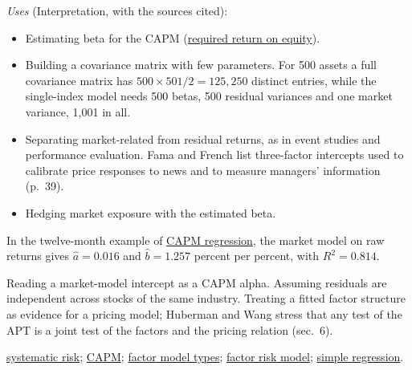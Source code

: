 \begin{qfmodel}
 \emph{Uses} (Interpretation, with the sources cited):
\begin{itemize}
\item Estimating beta for the CAPM (\hyperref[meth:required-return-on-equity]{required return on equity}).
\item Building a covariance matrix with few parameters. For 500 assets a full covariance matrix has $500\times501/2=125{,}250$ distinct entries, while the single-index model needs 500 betas, 500 residual variances and one market variance, 1{,}001 in all.
\item Separating market-related from residual returns, as in event studies and performance evaluation. Fama and French list three-factor intercepts used to calibrate price responses to news and to measure managers' information (p.~39).
\item Hedging market exposure with the estimated beta.
\end{itemize}
In the twelve-month example of \hyperref[meth:capm-regression]{CAPM regression}, the market model on raw returns gives $\hat a=0.016$ and $\hat b=1.257$ percent per percent, with $R^2=0.814$.

 Reading a market-model intercept as a CAPM alpha. Assuming residuals are independent across stocks of the same industry. Treating a fitted factor structure as evidence for a pricing model; Huberman and Wang stress that any test of the APT is a joint test of the factors and the pricing relation (sec.~6).

 \hyperref[mech:systematic-risk-pricing]{systematic risk}; \hyperref[mod:capm-sml]{CAPM}; \hyperref[def:factor-model-types]{factor model types}; \hyperref[mod:factor-risk-model]{factor risk model}; \hyperref[meth:simple-regression-estimation]{simple regression}.

\end{qfmodel}

